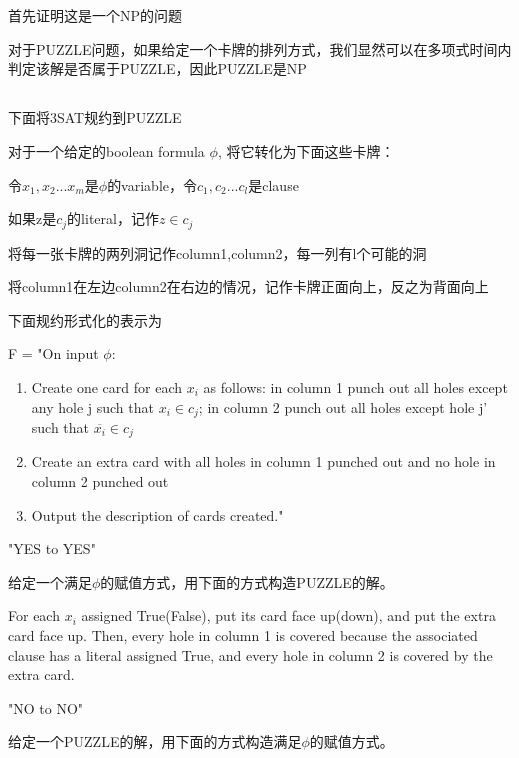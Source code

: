 \documentclass{zpt}
\begin{document}
\section{}
\subsection{}
首先证明这是一个NP的问题

  对于PUZZLE问题，如果给定一个卡牌的排列方式，我们显然可以在多项式时间内判定该解是否属于PUZZLE，因此PUZZLE是NP

\subsection{}
下面将3SAT规约到PUZZLE

对于一个给定的boolean formula $\phi$, 将它转化为下面这些卡牌：

令$x_1,x_2...x_m$是$\phi$的variable，令$c_1,c_2...c_l$是clause

如果z是$c_j$的literal，记作$z\in c_j$

将每一张卡牌的两列洞记作column1,column2，每一列有l个可能的洞

将column1在左边column2在右边的情况，记作卡牌正面向上，反之为背面向上

下面规约形式化的表示为

F = "On input $\phi$:

\begin{enumerate}
    \item Create one card for each $x_i$ as follows: in column 1 punch out all holes except any hole j such that $x_i\in c_j$; in column 2 punch out all holes except hole j' such that $\overline{x_i}\in c_j$
    \item Create an extra card with all holes in column 1 punched out and no hole in column 2 punched out
    \item Output the description of  cards created."
\end{enumerate}

"YES to YES"

给定一个满足$\phi$的赋值方式，用下面的方式构造PUZZLE的解。

For each $x_i$ assigned True(False), put its card face up(down), and put the extra card face up. Then, every hole in column 1 is covered because the associated clause has a literal assigned True, and every hole in column 2 is covered by the extra card.

"NO to NO"

给定一个PUZZLE的解，用下面的方式构造满足$\phi$的赋值方式。
\end{document}
